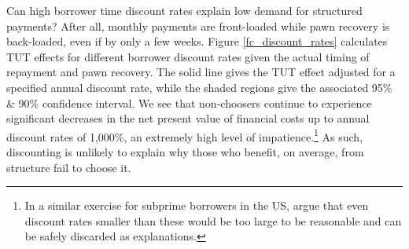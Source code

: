 \documentclass[12pt, a4paper, colorinlistoftodos]{article}
\begin{document}



Can high borrower time discount rates explain low demand for structured payments? %
After all, monthly payments are front-loaded while pawn recovery is back-loaded, even if by only a few weeks.  
Figure \ref{fc_discount_rates} calculates TUT effects for different borrower discount rates given the actual timing of repayment and pawn recovery. The solid line gives the TUT effect adjusted for a specified annual discount rate, while the shaded regions give the associated 95\% \& 90\% confidence interval.
We see that non-choosers continue to experience significant decreases in the net present value of financial costs up to annual discount rates of 1,000\%, an extremely high level of impatience.\footnote{In a similar exercise for subprime borrowers in the US, \cite{Levin} argue that even discount rates smaller than these would be too large to be reasonable and can be safely discarded as explanations.} As such, discounting is unlikely to explain why those who benefit, on average, from structure fail to choose it. %
\end{document}
